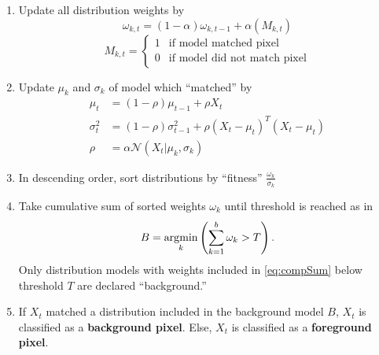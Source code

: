 \begin{enumerate}
	\item Update all distribution weights by 
	\begin{equation} \label{eq:weightUpdate}
	\omega_{k,t}=(1-\alpha)\omega_{k,t-1}+\alpha(M_{k,t})
	\end{equation}	
	\begin{equation} \label{eq:meq}
	M_{k,t} =
	\begin{cases}
	1 & \text{if model matched pixel}  \\
	0 & \text{if model did not match pixel} 
	\end{cases}
	\end{equation}
	
	\item Update $\mu_k$ and $\sigma_k$ of model which ``matched'' by 
	\begin{equation} \label{eq:muUpdate}
	\begin{split}
	\mu_t      & =(1-\rho)\mu_{t-1}+\rho X_t \\
	\sigma^2_t & =(1-\rho)\sigma^2_{t-1}+\rho(X_t-\mu_t)^T(X_t-\mu_t) \\
	\rho	   & =\alpha\mathcal{N}(X_t|\mu_k,\sigma_k)
	\end{split}
	\end{equation}
	
	\item In descending order, sort distributions by ``fitness'' $\frac{\omega_k}{\sigma_k}$
	
	\item Take cumulative sum of sorted weights $\omega_k$ until threshold is reached as in 
	\begin{equation} \label{eq:compSum}
	B = \operatorname*{\arg\!\min}\limits_k \left(\sum_{k=1}^{b}\omega_k>T\right).
	\end{equation}
	Only distribution models with weights included in \eqref{eq:compSum} below threshold $T$ are declared ``background.''
	
	\item If $X_t$ matched a distribution included in the background model $B$, $X_t$ is classified as a \textbf{background pixel}. Else, $X_t$ is classified as a \textbf{foreground pixel}.
\end{enumerate}

\FloatBarrier
